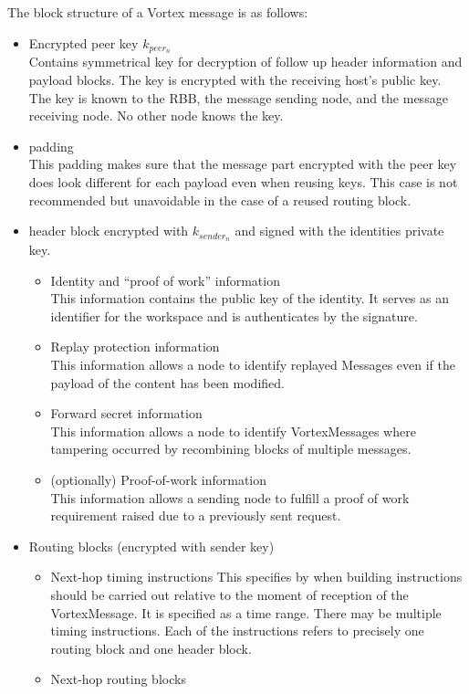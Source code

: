 \documentclass[10pt,journal,compsoc]{IEEEtran}
\begin{document}
The block structure of a Vortex message is as follows:
\begin{itemize}
	\item Encrypted peer key $k_{peer_n}$\\
	Contains symmetrical key for decryption of follow up header information and payload blocks. The key is encrypted with the receiving host's public key. The key is known to the RBB, the message sending node, and the message receiving node. No other node knows the key.
	\item padding\\
	This padding makes sure that the message part encrypted with the peer key does look different for each payload even when reusing keys. This case is not recommended but unavoidable in the case of a reused routing block. 
	\item header block encrypted with $k_{sender_n}$ and signed with the identities private key.
	\begin{itemize}
		\item Identity and ``proof of work'' information\\
		This information contains the public key of the identity. It serves as an identifier for the workspace and is authenticates by the signature.
		\item Replay protection information\\
		This information allows a node to identify replayed Messages even if the payload of the content has been modified.
		\item Forward secret information\\
		This information allows a node to identify VortexMessages where tampering occurred by recombining blocks of multiple messages.      
		\item (optionally) Proof-of-work information\\
		This information allows a sending node to fulfill a proof of work requirement raised due to a previously sent request.      
	\end{itemize}
	\item Routing blocks (encrypted with sender key)
	\begin{itemize}
		\item Next-hop timing instructions
		This specifies by when building instructions should be carried out relative to the moment of reception of the VortexMessage. It is specified as a time range. There may be multiple timing instructions. Each of the instructions refers to precisely one routing block and one header block.
		\item Next-hop routing blocks\\

\end{itemize}
\end{itemize}
\end{document}
